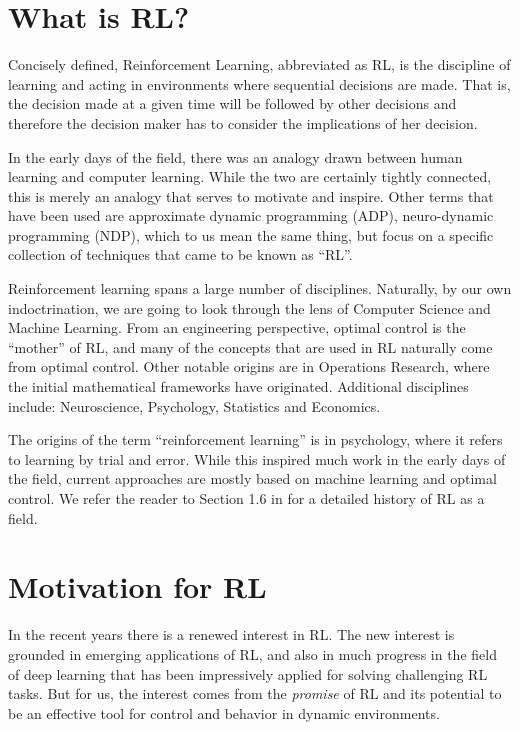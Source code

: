 \section{What is RL?}

Concisely defined, Reinforcement Learning, abbreviated as RL, is the discipline of learning and acting in 
environments where sequential decisions are made. That is, the decision made at a given time 
will be followed by other decisions and therefore the decision maker has to consider the implications 
of her decision.

In the early days of the field, there was an analogy drawn between human learning and computer 
learning. While the two are certainly tightly connected, this is merely an analogy that serves to motivate and inspire. Other terms that 
have been used are approximate dynamic programming (ADP), neuro-dynamic programming (NDP), which to us
mean the same thing, but focus on a specific collection of techniques that came to be known as ``RL''.

 \medskip
{}
%
Reinforcement learning spans a large number of disciplines.
Naturally, by our own indoctrination, we are going to look through the lens of Computer Science
and Machine Learning. From an engineering perspective, optimal control is 
the ``mother'' of RL, and many of the concepts that are used in RL naturally come from optimal control. 
Other notable origins are in Operations Research, where the initial mathematical frameworks have originated.
Additional disciplines include: Neuroscience, Psychology, Statistics and
Economics.

The origins of the term ``reinforcement learning'' is in psychology, where it refers to learning by trial and error. 
While this inspired much work in the early days of the field, current approaches are mostly based on
machine learning and optimal control. We refer the reader to Section 1.6 in \cite{SuttonB98} for 
a detailed history of RL as a field. 

\section{Motivation for RL}

In the recent years there is a renewed interest in RL. The new interest is grounded in  emerging applications
of RL, and also in much progress in the field of deep learning that
has been impressively applied for solving challenging RL tasks. 
But for us, the interest comes from the {\em promise} of RL and its
potential to be an effective tool for control and behavior in dynamic environments.

